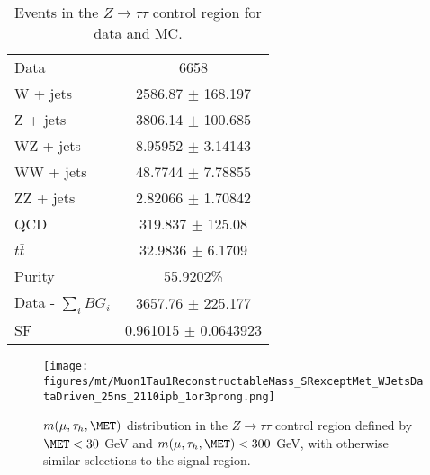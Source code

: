 \begin{table}[ht]
\begin{center}
 \caption{ Events in the $Z\rightarrow\tau\tau$ control region for data and MC.}
 \begin{tabular}{| l | c |}
 \hline\hline
Data & 6658 \\
W + jets & 2586.87 $\pm$ 168.197 \\
Z + jets & 3806.14 $\pm$ 100.685 \\
WZ + jets & 8.95952 $\pm$ 3.14143 \\
WW + jets & 48.7744 $\pm$ 7.78855 \\
ZZ + jets & 2.82066 $\pm$ 1.70842 \\
QCD & 319.837 $\pm$ 125.08 \\
$t\bar{t}$ & 32.9836 $\pm$ 6.1709 \\ \hline
Purity & 55.9202\% \\
Data - $\sum\limits_{i} BG_{i}$ & 3657.76 $\pm$ 225.177 \\ \hline
SF & 0.961015 $\pm$ 0.0643923 \\
 \hline
 \hline
 \end{tabular}
 \label{table:theztautauControlTable}
\end{center}
\end{table}

\begin{figure}
\begin{center}
\texttt{[image: figures/mt/Muon1Tau1ReconstructableMass\_SRexceptMet\_WJetsDataDriven\_25ns\_2110ipb\_1or3prong.png]}
\caption{ $m(\mu,\tau_{h},\MET)$ distribution in the $Z \to \tau\tau$ control region defined by $\MET < 30$ GeV and $m(\mu,\tau_{h},\MET) < 300$ GeV, with 
otherwise similar selections to the signal region.}
\label{fig:ZtautauControlPlots}
\end{center}
\end{figure}

